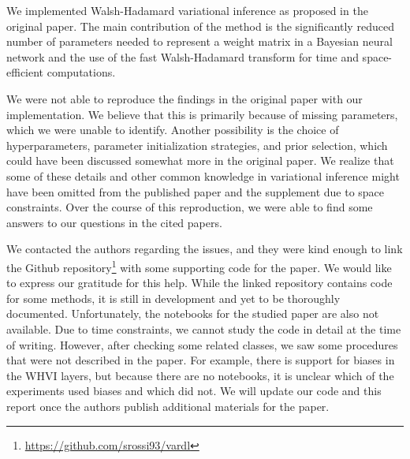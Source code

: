 We implemented Walsh-Hadamard variational inference as proposed in the original paper.
The main contribution of the method is the significantly reduced number of parameters needed to represent a weight matrix in a Bayesian neural network and the use of the fast Walsh-Hadamard transform for time and space-efficient computations.

We were not able to reproduce the findings in the original paper with our implementation.
We believe that this is primarily because of missing parameters, which we were unable to identify.
Another possibility is the choice of hyperparameters, parameter initialization strategies, and prior selection, which could have been discussed somewhat more in the original paper.
We realize that some of these details and other common knowledge in variational inference might have been omitted from the published paper and the supplement due to space constraints.
Over the course of this reproduction, we were able to find some answers to our questions in the cited papers.

We contacted the authors regarding the issues, and they were kind enough to link the Github repository\footnote{\url{https://github.com/srossi93/vardl}} with some supporting code for the paper.
We would like to express our gratitude for this help.
While the linked repository contains code for some methods, it is still in development and yet to be thoroughly documented.
Unfortunately, the notebooks for the studied paper are also not available.
Due to time constraints, we cannot study the code in detail at the time of writing.
However, after checking some related classes, we saw some procedures that were not described in the paper.
For example, there is support for biases in the WHVI layers, but because there are no notebooks, it is unclear which of the experiments used biases and which did not.
We will update our code and this report once the authors publish additional materials for the paper.
